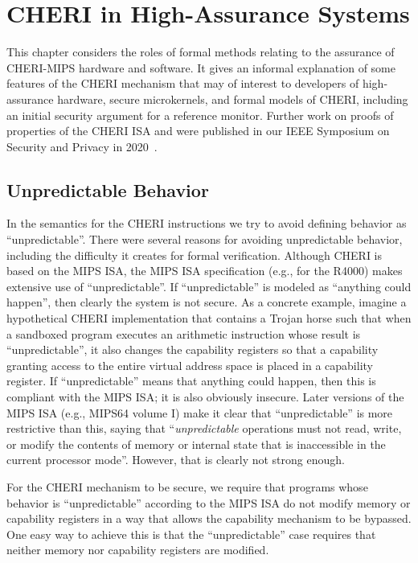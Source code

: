 \chapter{CHERI in High-Assurance Systems}
\label{chap:assurance}

This chapter considers the roles of formal methods relating to the assurance
of CHERI-MIPS hardware and software.  It gives an informal explanation of some
features of the CHERI mechanism that may of interest to developers of
high-assurance hardware, secure microkernels, and formal models of CHERI,
including an initial security argument for a reference monitor.  Further
work on proofs of properties of the CHERI ISA and were published in our
IEEE Symposium on Security and Privacy in 2020~\cite{cheri-formal-SP2020}.

\section{Unpredictable Behavior}

In the semantics for the CHERI instructions
we try 
to avoid defining behavior as ``unpredictable''. There were several reasons 
for avoiding unpredictable behavior, including the difficulty it creates for
formal verification.
Although CHERI is based on the MIPS ISA, 
the MIPS ISA specification (e.g., for the
R4000) makes extensive use of ``unpredictable''. If ``unpredictable'' is
modeled as ``anything could happen'', then clearly the system is not secure.
As a 
concrete example, imagine a hypothetical CHERI implementation that contains
a Trojan horse such that when a sandboxed program executes an arithmetic
instruction whose result is ``unpredictable'', it also changes the capability
registers so that a capability granting access to the entire virtual address
space is placed in a capability register. If ``unpredictable'' means that
anything could happen, then this is compliant with the MIPS ISA; it is also 
obviously insecure. Later versions of the MIPS ISA (e.g., MIPS64 volume I) make
it clear that ``unpredictable'' is more restrictive than this, saying that
``\emph{unpredictable} operations must not read, write, or modify the contents of
memory or internal state that is inaccessible in the current processor mode''.
However, that is clearly not strong enough.

For the CHERI mechanism to be secure, we require that programs whose behavior
is ``unpredictable'' according to the MIPS ISA do not modify memory or
capability registers in a way that allows the capability mechanism to be bypassed.
One easy way to achieve this is that the ``unpredictable'' case requires that
neither memory nor capability registers are modified.

